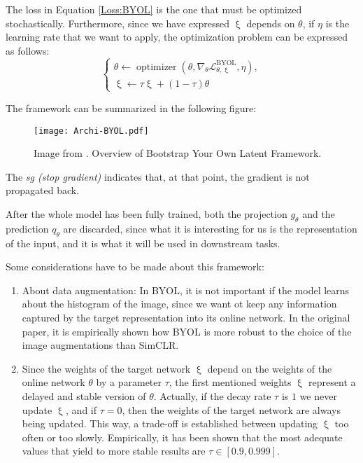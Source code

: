 The loss in Equation \eqref{Loss:BYOL} is the one that must be optimized stochastically. Furthermore, since we have expressed $\upxi$ depends on $\theta$, if $\eta$ is the learning rate that we want to apply, the optimization problem can be expressed as follows:
\[
\begin{cases}
    \theta \gets \operatorname{optimizer}\left(\theta,\nabla_\theta \mathcal L_{\theta,\upxi}^{\operatorname{BYOL}},\eta \right), \\
    \upxi \gets \tau \upxi + (1-\tau)\theta 
\end{cases}
\]

The framework can be summarized in the following figure:
\begin{figure}[H]
    \centering 
    \texttt{[image: Archi-BYOL.pdf]}
    \caption{Image from \citep{grill2020bootstrap}. Overview of Bootstrap Your Own Latent Framework. }
\end{figure}

The \emph{sg (stop gradient)} indicates that, at that point, the gradient is not propagated back. 

After the whole model has been fully trained, both the projection $g_\theta$  and the prediction $q_\theta$ are discarded, since what it is interesting for us is the representation of the input, and it is what it will be used in downstream tasks.

Some considerations have to be made about this framework:
\begin{enumerate}
    \item About data augmentation: In BYOL, it is not important if the model learns about the histogram of the image, since we want ot keep any information captured by the target representation into its online network. In the original paper, it is empirically shown how BYOL is more robust to the choice of the image augmentations than SimCLR.

    \item Since the weights of the target network $\upxi$ depend on the weights of the online network $\theta$ by a parameter $\tau$, the first mentioned weights $\upxi$ represent a delayed and stable version of $\theta$. Actually, if the decay rate $\tau$ is $1$ we never update $\upxi$, and if $\tau = 0 $, then the weights of the target network are always being updated. This way, a trade-off is established between updating $\upxi$ too often or too slowly. Empirically, it has been shown that the most adequate values that yield to more stable results are $\tau \in [0.9,0.999]$.
\end{enumerate}

